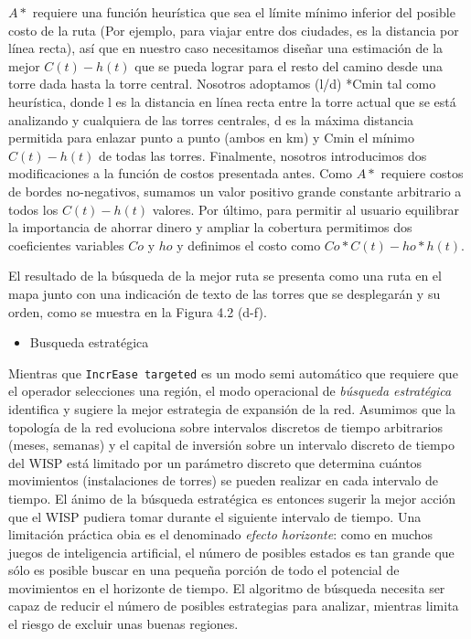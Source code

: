 \documentclass[]{article}
\providecommand{\tightlist}{%
  \setlength{\itemsep}{0pt}\setlength{\parskip}{0pt}}
\begin{document}
\(A*\) requiere una función heurística que sea el límite mínimo inferior
del posible costo de la ruta (Por ejemplo, para viajar entre dos
ciudades, es la distancia por línea recta), así que en nuestro caso
necesitamos diseñar una estimación de la mejor \(C(t)-h(t)\) que se
pueda lograr para el resto del camino desde una torre dada hasta la
torre central. Nosotros adoptamos (l/d) *Cmin tal como heurística, donde
l es la distancia en línea recta entre la torre actual que se está
analizando y cualquiera de las torres centrales, d es la máxima
distancia permitida para enlazar punto a punto (ambos en km) y Cmin el
mínimo \(C(t)-h(t)\) de todas las torres. Finalmente, nosotros
introducimos dos modificaciones a la función de costos presentada antes.
Como \(A*\) requiere costos de bordes no-negativos, sumamos un valor
positivo grande constante arbitrario a todos los \(C(t)-h(t)\) valores.
Por último, para permitir al usuario equilibrar la importancia de
ahorrar dinero y ampliar la cobertura permitimos dos coeficientes
variables \(Co\) y \(ho\) y definimos el costo como \(Co*C(t)-ho*h(t)\).

El resultado de la búsqueda de la mejor ruta se presenta como una ruta
en el mapa junto con una indicación de texto de las torres que se
desplegarán y su orden, como se muestra en la Figura 4.2 (d-f).

\begin{itemize}
\tightlist
\item
  Busqueda estratégica
\end{itemize}

Mientras que \texttt{IncrEase\ targeted} es un modo semi automático que
requiere que el operador selecciones una región, el modo operacional de
\emph{búsqueda estratégica} identifica y sugiere la mejor estrategia de
expansión de la red. Asumimos que la topología de la red evoluciona
sobre intervalos discretos de tiempo arbitrarios (meses, semanas) y el
capital de inversión sobre un intervalo discreto de tiempo del WISP está
limitado por un parámetro discreto que determina cuántos movimientos
(instalaciones de torres) se pueden realizar en cada intervalo de
tiempo. El ánimo de la búsqueda estratégica es entonces sugerir la mejor
acción que el WISP pudiera tomar durante el siguiente intervalo de
tiempo. Una limitación práctica obia es el denominado \emph{efecto
horizonte}: como en muchos juegos de inteligencia artificial, el número
de posibles estados es tan grande que sólo es posible buscar en una
pequeña porción de todo el potencial de movimientos en el horizonte de
tiempo. El algoritmo de búsqueda necesita ser capaz de reducir el número
de posibles estrategias para analizar, mientras limita el riesgo de
excluir unas buenas regiones.
\end{document}

